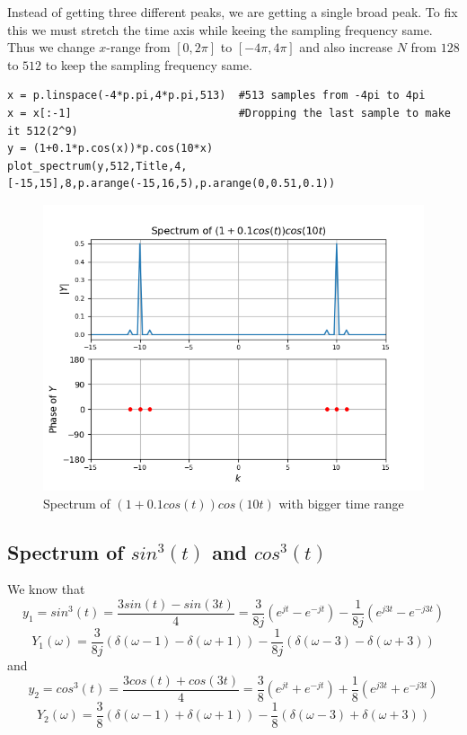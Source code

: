 \documentclass[11pt, a4paper]{article}
\begin{document}
        Instead of getting three different peaks, we are getting a single broad peak. To fix this we must stretch the time axis while keeing the sampling frequency same. Thus we change $x$-range from $[0,2\pi]$ to $[-4\pi,4\pi]$ and also increase $N$ from $128$ to $512$ to keep the sampling frequency same.
        \begin{verbatim}
x = p.linspace(-4*p.pi,4*p.pi,513)  #513 samples from -4pi to 4pi
x = x[:-1]                          #Dropping the last sample to make it 512(2^9)
y = (1+0.1*p.cos(x))*p.cos(10*x)
plot_spectrum(y,512,Title,4,[-15,15],8,p.arange(-15,16,5),p.arange(0,0.51,0.1))
        \end{verbatim}
        \begin{figure}[!h]
            \centering
            \includegraphics[scale = .7]{Figure 4.png}
            \caption{Spectrum of $(1+0.1cos(t))cos(10t)$ with bigger time range}
            \label{fig:Figure 4}
        \end{figure}
    \subsection{Spectrum of $sin^3(t)$ and $cos^3(t)$}
    We know that
    \begin{equation*}
        y_1 = sin^3(t) = \frac{3sin(t) - sin(3t)}{4} = \frac{3}{8j}(e^{jt} - e^{-jt}) - \frac{1}{8j}(e^{j3t} - e^{-j3t})
    \end{equation*}
    \begin{equation*}
        Y_1(\omega) = \frac{3}{8j}(\delta(\omega-1) - \delta(\omega+1)) - \frac{1}{8j}(\delta(\omega-3) - \delta(\omega+3))
    \end{equation*}
    and
    \begin{equation*}
        y_2 = cos^3(t) = \frac{3cos(t) + cos(3t)}{4} = \frac{3}{8}(e^{jt} + e^{-jt}) + \frac{1}{8}(e^{j3t} + e^{-j3t})
    \end{equation*}
    \begin{equation*}
        Y_2(\omega) = \frac{3}{8}(\delta(\omega-1) + \delta(\omega+1)) - \frac{1}{8}(\delta(\omega-3) + \delta(\omega+3))        
    \end{equation*}
    
\end{document}
